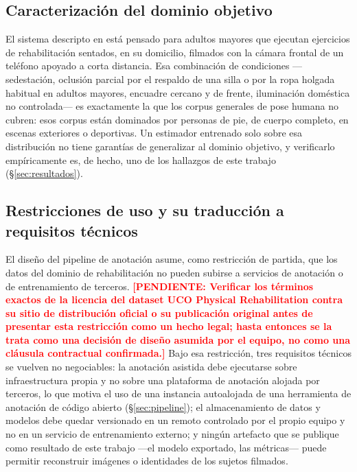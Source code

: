\documentclass[10pt,a4paper,twocolumn]{article}
\newcommand{\pendiente}[1]{\textcolor{red}{\textbf{[PENDIENTE: #1]}}}
\begin{document}
\subsection{Caracterización del dominio objetivo}
El sistema descripto en \cite{anonimo_previo} está pensado para adultos
mayores que ejecutan ejercicios de rehabilitación sentados, en su domicilio,
filmados con la cámara frontal de un teléfono apoyado a corta distancia. Esa
combinación de condiciones —sedestación, oclusión parcial por el respaldo de
una silla o por la ropa holgada habitual en adultos mayores, encuadre cercano
y de frente, iluminación doméstica no controlada— es exactamente la que los
corpus generales de pose humana no cubren: esos corpus están dominados por
personas de pie, de cuerpo completo, en escenas exteriores o deportivas. Un
estimador entrenado solo sobre esa distribución no tiene garantías de
generalizar al dominio objetivo, y verificarlo empíricamente es, de hecho, uno
de los hallazgos de este trabajo (\S\ref{sec:resultados}).

\subsection{Restricciones de uso y su traducción a requisitos técnicos}
El diseño del pipeline de anotación asume, como restricción de partida, que
los datos del dominio de rehabilitación no pueden subirse a servicios de
anotación o de entrenamiento de terceros. \pendiente{Verificar los términos
exactos de la licencia del dataset UCO Physical Rehabilitation contra su sitio
de distribución oficial o su publicación original antes de presentar esta
restricción como un hecho legal; hasta entonces se la trata como una decisión
de diseño asumida por el equipo, no como una cláusula contractual confirmada.}
Bajo esa restricción, tres requisitos técnicos se vuelven no negociables: la
anotación asistida debe ejecutarse sobre infraestructura propia y no sobre una
plataforma de anotación alojada por terceros, lo que motiva el uso de una
instancia autoalojada de una herramienta de anotación de código abierto
(\S\ref{sec:pipeline}); el almacenamiento de datos y modelos debe quedar
versionado en un remoto controlado por el propio equipo y no en un servicio
de entrenamiento externo; y ningún artefacto que se publique como resultado
de este trabajo —el modelo exportado, las métricas— puede permitir
reconstruir imágenes o identidades de los sujetos filmados.
\end{document}
